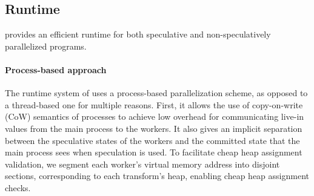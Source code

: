 \subsection{Runtime}

\name provides an efficient runtime
for both speculative and non-speculatively parallelized programs.

\paragraph{Process-based approach}
The runtime system of \name uses a process-based parallelization scheme,
as opposed to a thread-based one for multiple reasons. First, it allows the
use of copy-on-write (CoW) semantics of
processes to achieve low overhead for communicating live-in values from the
main process to the workers.
It also gives an implicit separation between the speculative states of the
workers and the committed state that the main process sees when
speculation is used. To facilitate cheap heap assignment validation, we
segment each worker's virtual memory address into disjoint sections,
corresponding to each transform's heap, enabling cheap heap assignment
checks.

